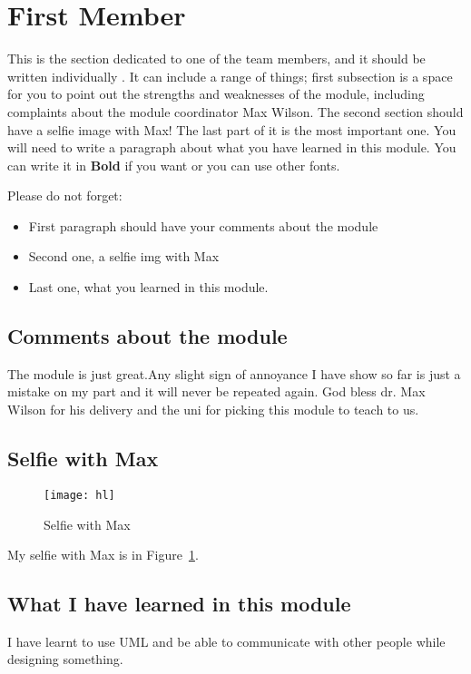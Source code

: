 \section{First Member}
This is the section dedicated to one of the team members, and it should be written individually . It can include a range of things; first subsection is a space for you to point out the strengths and weaknesses of the module, including complaints about the module coordinator Max Wilson. The second section should have a selfie image with Max! The last part of it is the most important one. You will need to write a paragraph about what you have learned in this module. You can write it in \textbf{Bold} if you want or you can use other fonts. 

Please do not forget:
\begin{itemize}
	\item First paragraph should have your comments about the module
	\item Second one, a selfie img with Max
	\item Last one, what you learned in this module.
\end{itemize}

\subsection{Comments about the module}
The module is just great.Any slight sign of annoyance I have show so far is just a mistake on my part and it will never be repeated again. God bless dr. Max Wilson for his delivery and the uni for picking this module to teach to us.

\subsection{Selfie with Max}
\begin{figure}[h]
\caption{Selfie with Max}
\centering
\texttt{[image: hl]}
\label{fig:selfie}
\end{figure}



My selfie with Max is in  Figure~\ref{fig:selfie}.

\subsection{What I have learned in this module}
I have learnt to use UML and be able to communicate with other people while designing something.

